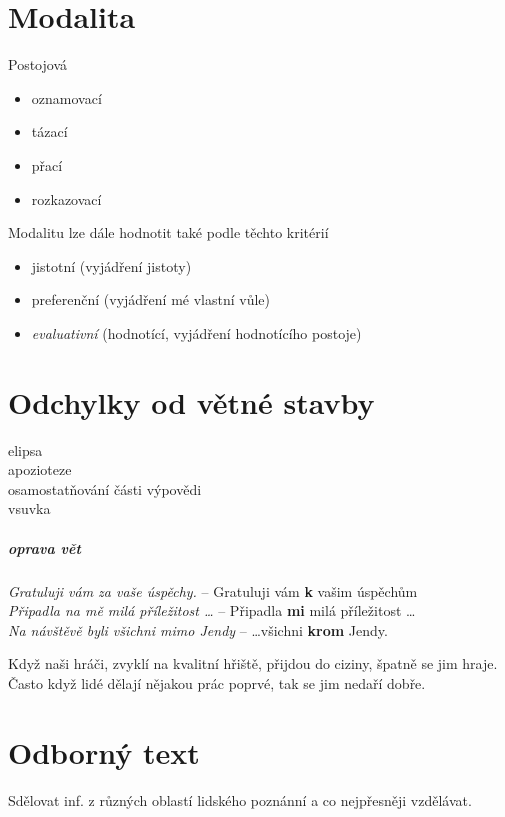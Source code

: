 \documentclass[10pt,a4page,headings,openany,%
oneside
,twocolumn
]{report}
\begin{document}
	\chapter{Modalita}
	Postojová
	\begin{itemize}
	\item oznamovací \item tázací \item přací \item rozkazovací
	\end{itemize}
	Modalitu lze dále hodnotit také podle těchto kritérií
	\begin{itemize}
	\item jistotní (vyjádření jistoty) \item preferenční (vyjádření mé vlastní vůle) \item \textit{evaluativní} (hodnotící, vyjádření hodnotícího postoje)
	\end{itemize}


\chapter{Odchylky od větné stavby}

\begin{description}
\item[elipsa]
\item[apozioteze]
\item[osamostatňování části výpovědi]
\item[vsuvka]
\end{description}

\paragraph{oprava vět}

\emph{Gratuluji vám za vaše úspěchy.} --  Gratuluji vám \textbf{k}  vašim úspěchům\\
\emph{Připadla na mě milá příležitost \dots} -- Připadla \textbf{mi} milá příležitost \dots\\
\emph{Na návštěvě byli všichni mimo Jendy} -- \dots všichni \textbf{krom}  Jendy.
\vspace{0.5cm}

Když naši hráči, zvyklí na kvalitní hřiště, přijdou do ciziny, špatně se jim hraje. Často když lidé dělají nějakou prác poprvé, tak se jim nedaří dobře. 

\chapter{Odborný text}
Sdělovat inf. z různých oblastí lidského poznánní a co nejpřesněji vzdělávat.
\end{document}
